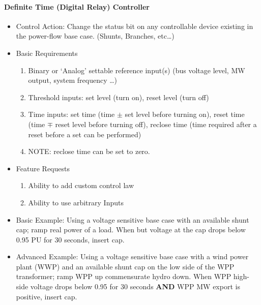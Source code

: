 \documentclass[12pt]{article}
\begin{document}
\begin{multicols}{2}
\vfill\null
\columnbreak

\paragraph{Definite Time (Digital Relay) Controller}
\begin{itemize}
	\item Control Action: Change the status bit on any controllable device existing in the power-flow base case. (Shunts, Branches, etc\ldots)
	\item Basic Requirements
	\begin{enumerate}
		\item Binary or `Analog' settable reference input(s) (bus voltage level, MW output, system frequency \ldots) 
		\item Threshold inputs: set level (turn on), reset level (turn off)
		\item Time inputs: set time (time $\pm$ set level before turning on), reset time (time $\mp$ reset level before turning off), reclose time (time required after a reset before a set can be performed)
		\item NOTE: reclose time can be set to zero.
	\end{enumerate}
	\item Feature Requests
	\begin{enumerate}
		\item Ability to add custom control law
		\item Ability to use arbitrary Inputs
	\end{enumerate}
	\item Basic Example: Using a voltage sensitive base case with an available shunt cap; ramp real power of a load. When but voltage at the cap drops below 0.95 PU for 30 seconds, insert cap.
	\item Advanced Example: Using a voltage sensitive base case with a wind power plant (WWP) and an available shunt cap on the low side of the WPP transformer; ramp WPP up commensurate hydro down. When WPP high-side voltage drops below 0.95 for 30 seconds \textbf{AND} WPP MW export is positive, insert cap.
\end{itemize}

\vfill\null

\end{multicols}
\end{document}
